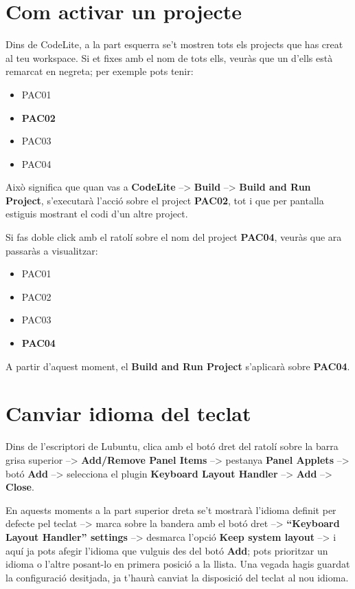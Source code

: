 \documentclass[]{book}
\providecommand{\tightlist}{%
  \setlength{\itemsep}{0pt}\setlength{\parskip}{0pt}}
\begin{document}
\section{Com activar un projecte}\label{com-activar-un-projecte}

Dins de CodeLite, a la part esquerra se't mostren tots els projects que
has creat al teu workspace. Si et fixes amb el nom de tots ells, veuràs
que un d'ells està remarcat en negreta; per exemple pots tenir:

\begin{itemize}
\tightlist
\item
  PAC01
\item
  \textbf{PAC02}
\item
  PAC03
\item
  PAC04
\end{itemize}

Això significa que quan vas a \textbf{CodeLite} --\textgreater{}
\textbf{Build} --\textgreater{} \textbf{Build and Run Project},
s'executarà l'acció sobre el project \textbf{PAC02}, tot i que per
pantalla estiguis mostrant el codi d'un altre project.

Si fas doble click amb el ratolí sobre el nom del project
\textbf{PAC04}, veuràs que ara passaràs a visualitzar:

\begin{itemize}
\tightlist
\item
  PAC01
\item
  PAC02
\item
  PAC03
\item
  \textbf{PAC04}
\end{itemize}

A partir d'aquest moment, el \textbf{Build and Run Project} s'aplicarà
sobre \textbf{PAC04}.

\section{Canviar idioma del teclat}\label{canviar-idioma-del-teclat}

Dins de l'escriptori de Lubuntu, clica amb el botó dret del ratolí sobre
la barra grisa superior --\textgreater{} \textbf{Add/Remove Panel Items}
--\textgreater{} pestanya \textbf{Panel Applets} --\textgreater{} botó
\textbf{Add} --\textgreater{} selecciona el plugin \textbf{Keyboard
Layout Handler} --\textgreater{} \textbf{Add} --\textgreater{}
\textbf{Close}.

En aquests moments a la part superior dreta se't mostrarà l'idioma
definit per defecte pel teclat --\textgreater{} marca sobre la bandera
amb el botó dret --\textgreater{} \textbf{``Keyboard Layout Handler''
settings} --\textgreater{} desmarca l'opció \textbf{Keep system layout}
--\textgreater{} i aquí ja pots afegir l'idioma que vulguis des del botó
\textbf{Add}; pots prioritzar un idioma o l'altre posant-lo en primera
posició a la llista. Una vegada hagis guardat la configuració desitjada,
ja t'haurà canviat la disposició del teclat al nou idioma.
\end{document}
